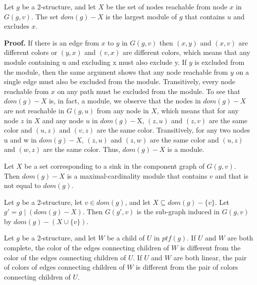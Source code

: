\begin{mylem}
    \label{lem:5-3}
    Let $g$ be a 2-structure, and let $X$ be the set of nodes reachable from node $x$ in $G(g, v)$.
    The set $dom(g) - X$ is the largest module of $g$ that contains $u$ and excludes $x$.
\end{mylem}

\textbf{Proof.}
If there is an edge from $x$ to $y$ in $G(g, v)$ then $(x, y)$ and $(x, v)$ are different colors or $(y, x)$ and $(v, x)$ are different colors, which means that any module containing u and excluding x must also exclude y.
If $y$ is excluded from the module, then the same argument shows that any node reachable from $y$ on a single edge must also be excluded from the module.
Transitively, every node reachable from $x$ on any path must be excluded from the module.
To see that $dom(g) - X$ is, in fact, a module, we observe that the nodes in $dom(g) - X$ are not reachable in $G(g, u)$ from any node in $X$, which means that for any node $z$ in $X$ and any node $u$ in $dom(g) - $X, $(z, u)$ and $(z, v)$ are the same color and $(u, z)$ and $(v,z)$ are the same color.
Transitively, for any two nodes u and w in $dom(g) - X$, $(z, u)$ and $(z, w)$ are the same color and $(u, z)$ and $(w, z)$ are the same color.
Thus, $dom(g) - X$ is a module.

\begin{mycor}
    \label{cor:}
    Let $X$ be a set corresponding to a sink in the component graph of $G(g, v)$.
    Then $dom(g) - X$ is a maximal-cardinality module that contains $v$ and that is not equal to $dom(g)$.
\end{mycor}

\begin{mypro}
    \label{prop:5-4}
    Let $g$ be a 2-structure, let $v \in dom(g)$, and let $X \subseteq dom(g) - \{v\}$.
    Let $g' = g \mid (dom(g) - X)$.
    Then $G(g', v)$ is the sub-graph induced in $G(g, v)$ by $dom(g) - (X \cup \{v\})$.
\end{mypro}

\begin{mytheo}
    \label{thm:5-5}
    Let $g$ be a 2-structure, and let $W$ be a child of $U$ in $ptf(g)$.
    If $U$ and $W$ are both complete, the color of the edges connecting children of $W$ is different from the color of the edges connecting children of $U$.
    If $U$ and $W$ are both linear, the pair of colors of edges connecting children of $W$ is different from the pair of colors connecting children of $U$.
\end{mytheo}

